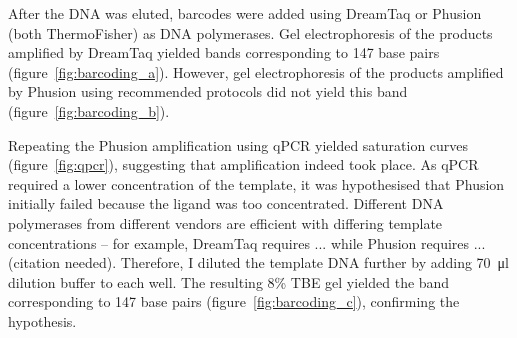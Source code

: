 \documentclass[parskip=full, numbers=noenddot]{scrreprt}
\begin{document}
After the DNA was eluted, barcodes were added using DreamTaq or Phusion (both ThermoFisher) as DNA polymerases.  Gel electrophoresis of the products amplified by DreamTaq yielded bands corresponding to 147 base pairs (figure~\ref{fig:barcoding_a}).  However, gel electrophoresis of the products amplified by Phusion using recommended protocols did not yield this band (figure~\ref{fig:barcoding_b}).

Repeating the Phusion amplification using qPCR yielded saturation curves (figure~\ref{fig:qpcr}), suggesting that amplification indeed took place.  As qPCR required a lower concentration of the template, it was hypothesised that Phusion initially failed because the ligand was too concentrated.  Different DNA polymerases from different vendors are efficient with differing template concentrations – for example, DreamTaq requires ... while Phusion requires ... (citation needed).  Therefore, I diluted the template DNA further by adding \SI{70}{\micro\litre} dilution buffer to each well. The resulting 8\% TBE gel yielded the band corresponding to 147 base pairs (figure~\ref{fig:barcoding_c}), confirming the hypothesis.
\end{document}
